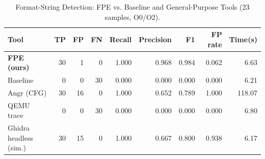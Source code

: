 \begin{table}[t]
\centering
\caption{Format-String Detection: FPE vs. Baseline and General-Purpose Tools (23 samples, O0/O2).}
\label{tab:fmt-fpe-comparison}
\small
\begin{tabular}{lrrrrrrrr}
\hline
Tool & TP & FP & FN & Recall & Precision & F1 & FP rate & Time(s) \\
\hline
  \textbf{FPE (ours)} & 30 & 1 & 0 & 1.000 & 0.968 & 0.984 & 0.062 & 6.63 \\
  Baseline & 0 & 0 & 30 & 0.000 & 0.000 & 0.000 & 0.000 & 6.21 \\
  Angr (CFG) & 30 & 16 & 0 & 1.000 & 0.652 & 0.789 & 1.000 & 118.07 \\
  QEMU trace & 0 & 0 & 30 & 0.000 & 0.000 & 0.000 & 0.000 & 6.80 \\
  Ghidra headless (sim.) & 30 & 15 & 0 & 1.000 & 0.667 & 0.800 & 0.938 & 6.17 \\
\hline
\end{tabular}
\end{table}